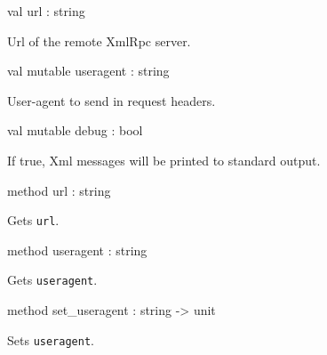 \documentclass[11pt]{article}
\begin{document}
\begin{ocamldocobjectend}


\label{val:XmlRpc.client.url}\begin{ocamldoccode}
val url : string
\end{ocamldoccode}
\begin{ocamldocdescription}
Url of the remote XmlRpc server.


\end{ocamldocdescription}


\label{val:XmlRpc.client.useragent}\begin{ocamldoccode}
val mutable useragent : string
\end{ocamldoccode}
\begin{ocamldocdescription}
User-agent to send in request headers.


\end{ocamldocdescription}


\label{val:XmlRpc.client.debug}\begin{ocamldoccode}
val mutable debug : bool
\end{ocamldoccode}
\begin{ocamldocdescription}
If true, Xml messages will be printed to standard output.


\end{ocamldocdescription}


\label{method:XmlRpc.client.url}\begin{ocamldoccode}
method url : string
\end{ocamldoccode}
\begin{ocamldocdescription}
Gets {\tt{url}}.


\end{ocamldocdescription}


\label{method:XmlRpc.client.useragent}\begin{ocamldoccode}
method useragent : string
\end{ocamldoccode}
\begin{ocamldocdescription}
Gets {\tt{useragent}}.


\end{ocamldocdescription}


\label{method:XmlRpc.client.set-underscoreuseragent}\begin{ocamldoccode}
method set_useragent : string -> unit
\end{ocamldoccode}
\begin{ocamldocdescription}
Sets {\tt{useragent}}.



\end{ocamldocdescription}
\end{ocamldocobjectend}
\end{document}
